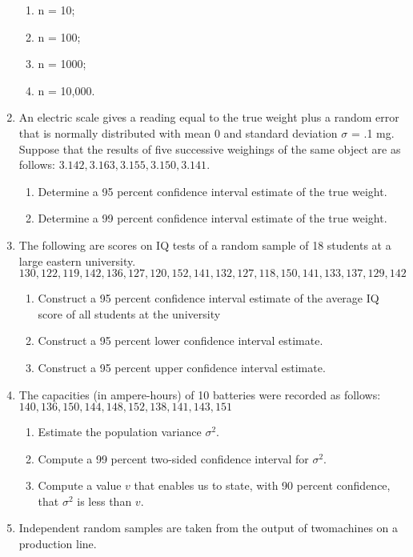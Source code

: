 \documentclass{article}
\begin{document}
\begin{enumerate}
    \begin{enumerate}
        \item n = 10;
        \item n = 100;
        \item n = 1000;
        \item n = 10,000.
    \end{enumerate}
    \item An electric scale gives a reading equal to the true weight plus a random error that is normally distributed with mean 0 and standard deviation $\sigma$ = .1 mg. Suppose that the results of five successive weighings of the same object are as follows: $3.142, 3.163, 3.155, 3.150, 3.141$.
    \begin{enumerate}
        \item Determine a 95 percent confidence interval estimate of the true weight.
        \item Determine a 99 percent confidence interval estimate of the true weight.
    \end{enumerate}
    \item  The following are scores on IQ tests of a random sample of 18 students at a large eastern university.
    $130, 122, 119, 142, 136, 127, 120, 152, 141, 132, 127, 118, 150, 141, 133, 137, 129, 142$
    \begin{enumerate}
        \item Construct a 95 percent confidence interval estimate of the average IQ score of all students at the university
        \item Construct a 95 percent lower confidence interval estimate.
        \item Construct a 95 percent upper confidence interval estimate.
    \end{enumerate}
    \item The capacities (in ampere-hours) of 10 batteries were recorded as follows:
    $140, 136, 150, 144, 148, 152, 138, 141, 143, 151$
    \begin{enumerate}
        \item Estimate the population variance $\sigma^2$.
        \item Compute a 99 percent two-sided confidence interval for $\sigma^2$.
        \item Compute a value $v$ that enables us to state, with 90 percent confidence, that $\sigma^2$ is less than $v$.
    \end{enumerate}
    \item Independent random samples are taken from the output of twomachines on a production line. 

\end{enumerate}
\end{document}
